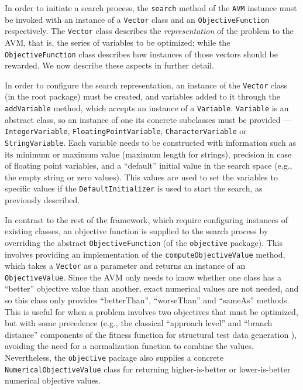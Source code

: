 \documentclass{llncs}
\newcommand{\inlineheading}[1]{\vspace{1ex} \noindent {\bf #1.}}
\begin{document}
\begin{sloppypar}
In order to initiate a search process, the {\tt search} method of the {\tt AVM} instance must be invoked with an instance of a {\tt Vector} class and an {\tt ObjectiveFunction} respectively. The {\tt Vector} class describes the {\it representation} of the problem to the AVM, that is, the series of variables to be optimized; while the {\tt ObjectiveFunction} class describes how instances of those vectors should be rewarded. We now describe these aspects in further detail.
\end{sloppypar}

\begin{sloppypar}
\inlineheading{Representation} In order to configure the search representation, an instance of the {\tt Vector} class (in the root package) must be created, and variables added to it through the {\tt addVariable} method, which accepts an instance of a {\tt Variable}. {\tt Variable} is an abstract class, so an instance of one its concrete subclasses must be provided --- {\tt IntegerVariable}, {\tt FloatingPointVariable}, {\tt CharacterVariable} or {\tt StringVariable}. Each variable needs to be constructed with information such as its minimum or maximum value (maximum length for strings), precision in case of floating point variables, and a ``default'' initial value in the search space (e.g., the empty string or zero values). This values are used to set the variables to specific values if the {\tt DefaultInitializer} is used to start the search, as previously described.
\end{sloppypar}

\begin{sloppypar}
\inlineheading{Objective Function} In contrast to the rest of the framework, which require configuring instances of existing classes, an objective function is supplied to the search process by overriding the abstract {\tt ObjectiveFunction} (of the {\tt objective} package). This involves providing an implementation of the {\tt computeObjectiveValue} method, which takes a {\tt Vector} as a parameter and returns an instance of an {\tt ObjectiveValue}. Since the AVM only needs to know whether one class has a ``better'' objective value than another, exact numerical values are not needed, and so this class only provides ``betterThan'', ``worseThan'' and ``sameAs'' methods. This is useful for when a problem involves two objectives that must be optimized, but with some precedence (e.g., the classical ``approach level'' and ``branch distance'' components of the fitness function for structural test data generation \cite{}), avoiding the need for a normalization function to combine the values. %
Nevertheless, the {\tt objective} package also supplies a concrete {\tt NumericalObjectiveValue} class for returning higher-is-better or lower-is-better numerical objective values.
\end{sloppypar}
\end{document}
